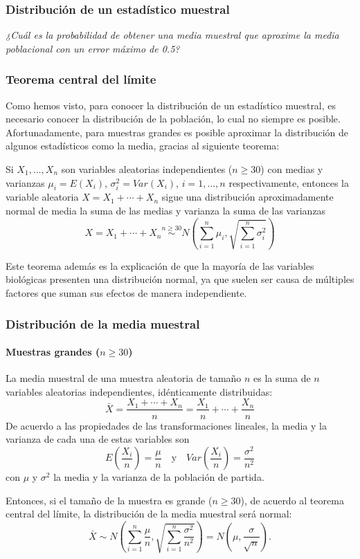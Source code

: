 \begin{frame}
\frametitle{Distribución de un estadístico muestral}
\begin{center}
\scalebox{0.5}{}
\quad
\scalebox{0.5}{}

\emph{¿Cuál es la probabilidad de obtener una media muestral que aproxime la media poblacional con un error máximo de 0.5?}
\end{center}
\end{frame}


\begin{frame}
\frametitle{Teorema central del límite}
Como hemos visto, para conocer la distribución de un estadístico muestral, es necesario conocer la distribución de la
población, lo cual no siempre es posible. Afortunadamente, para muestras grandes es posible aproximar la distribución de algunos estadísticos como la media, gracias al siguiente teorema:

\begin{teorema}
Si $X_1,\ldots, X_n$ son variables aleatorias independientes  ($n\geq 30$) con medias y varianzas $\mu_i=E(X_i)$, $\sigma^2_i=Var(X_i)$, $i=1,\ldots,n$ respectivamente, entonces la variable aleatoria $X=X_1+\cdots+X_n$ sigue una distribución aproximadamente normal de media la suma de las medias y varianza la suma de las varianzas
\[
X=X_1+\cdots+X_n\stackrel{n\geq 30} \sim N\left(\sum_{i=1}^n \mu_i, \sqrt{\sum_{i=1}^n \sigma^2_i}\right)
\]
\end{teorema}

Este teorema además es la explicación de que la mayoría de las variables biológicas presenten una distribución normal, ya que suelen ser causa de múltiples factores que suman sus efectos de manera independiente.
\end{frame}


\begin{frame}
\frametitle{Distribución de la media muestral}
\framesubtitle{Muestras grandes ($n\geq 30$)}
La media muestral de una muestra aleatoria de tamaño $n$ es la suma de $n$ variables aleatorias independientes, idénticamente distribuidas:
\[
\bar X = \frac{X_1+\cdots+X_n}{n} = \frac{X_1}{n}+\cdots+\frac{X_n}{n}
\]
De acuerdo a las propiedades de las transformaciones lineales, la media y la varianza de cada una de estas variables son
\[
E\left(\frac{X_i}{n}\right) =\frac{\mu}{n} \quad  \mbox{y} \quad Var\left(\frac{X_i}{n}\right) = \frac{\sigma^2}{n^2}
\]
con $\mu$ y $\sigma^2$ la media y la varianza de la población de partida. 

Entonces, si el tamaño de la muestra es grande ($n\geq 30$), de acuerdo al teorema central del límite, la distribución de la media muestral será normal:
\[
\bar X \sim N\left(\sum_{i=1}^n \frac{\mu}{n},\sqrt{\sum_{i=1}^n \frac{\sigma^2}{n^2}} \right) = N\left(\mu,\frac{\sigma}{\sqrt{n}} \right).
\]
\end{frame}


